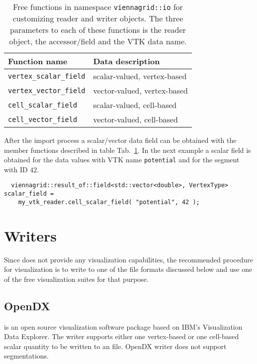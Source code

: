  \begin{table}[tb]
 \begin{center}
  \begin{tabular}{|l|l|}
   \hline
   Function name & Data description \\
   \hline
   \lstinline|vertex_scalar_field| & scalar-valued, vertex-based \\
   \lstinline|vertex_vector_field| & vector-valued, vertex-based \\
   \hline
   \lstinline|cell_scalar_field| & scalar-valued, cell-based \\
   \lstinline|cell_vector_field| & vector-valued, cell-based \\
   \hline
  \end{tabular}
 \end{center}
 \caption{Free functions in namespace \lstinline|viennagrid::io| for customizing reader and writer objects. The three parameters to each of these functions is the reader object, the accessor/field and the VTK data name.}
 \label{tab:io-field-obtaining}
 \end{table}

 After the import process a scalar/vector data field can be obtained with the member functions described in table Tab.~\ref{tab:io-field-obtaining}. In the next example a scalar field is obtained for the data values with VTK name \texttt{potential} and for the segment with ID $42$.

 \begin{lstlisting}
  viennagrid::result_of::field<std::vector<double>, VertexType> scalar_field =
    my_vtk_reader.cell_scalar_field( "potential", 42 );
 \end{lstlisting}



\section{Writers}
Since {\ViennaGrid} does not provide any visualization capabilities, the recommended procedure for visualization is
to write to one of the file formats discussed below and use one of the free visualization suites for that purpose.


 \subsection{OpenDX}
 {\OpenDX} \cite{opendx} is an open source visualization software package based on IBM's Visualization Data Explorer.
 The writer supports either one vertex-based or one cell-based scalar quantity to be written to an {\OpenDX} file. OpenDX writer does not support segmentations.

